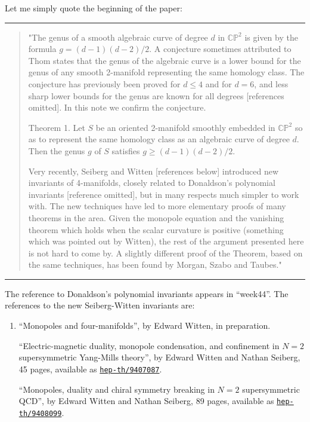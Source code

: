 \documentclass{article}
\begin{document}
Let me simply quote the beginning of the paper:

\begin{center}\rule{0.5\linewidth}{0.5pt}\end{center}

\begin{quote}
"The genus of a smooth algebraic curve of degree \(d\) in
\(\mathbb{CP}^2\) is given by the formula \(g = (d-1)(d-2)/2\). A
conjecture sometimes attributed to Thom states that the genus of the
algebraic curve is a lower bound for the genus of any smooth 2-manifold
representing the same homology class. The conjecture has previously been
proved for \(d \leqslant 4\) and for \(d = 6\), and less sharp lower
bounds for the genus are known for all degrees {[}references omitted{]}.
In this note we confirm the conjecture.

Theorem 1. Let \(S\) be an oriented 2-manifold smoothly embedded in
\(\mathbb{CP}^2\) so as to represent the same homology class as an
algebraic curve of degree \(d\). Then the genus \(g\) of \(S\) satisfies
\(g \geqslant (d-1)(d-2)/2\).

Very recently, Seiberg and Witten {[}references below{]} introduced new
invariants of 4-manifolds, closely related to Donaldson's polynomial
invariants {[}reference omitted{]}, but in many respects much simpler to
work with. The new techniques have led to more elementary proofs of many
theorems in the area. Given the monopole equation and the vanishing
theorem which holds when the scalar curvature is positive (something
which was pointed out by Witten), the rest of the argument presented
here is not hard to come by. A slightly different proof of the Theorem,
based on the same techniques, has been found by Morgan, Szabo and
Taubes."
\end{quote}

\begin{center}\rule{0.5\linewidth}{0.5pt}\end{center}

The reference to Donaldson's polynomial invariants appears in
``week44''. The references to the new Seiberg-Witten invariants are:

\begin{enumerate}
\def\labelenumi{\arabic{enumi})}
\setcounter{enumi}{1}
\item
  ``Monopoles and four-manifolds'', by Edward Witten, in preparation.

  ``Electric-magnetic duality, monopole condensation, and confinement in
  \(N=2\) supersymmetric Yang-Mills theory'', by Edward Witten and
  Nathan Seiberg, 45 pages, available as
  \href{http://xxx.lanl.gov/abs/hep-th/9407087}{\texttt{hep-th/9407087}}.

  ``Monopoles, duality and chiral symmetry breaking in \(N=2\)
  supersymmetric QCD'', by Edward Witten and Nathan Seiberg, 89 pages,
  available as
  \href{http://xxx.lanl.gov/abs/hep-th/9408099}{\texttt{hep-th/9408099}}.
\end{enumerate}
\end{document}
